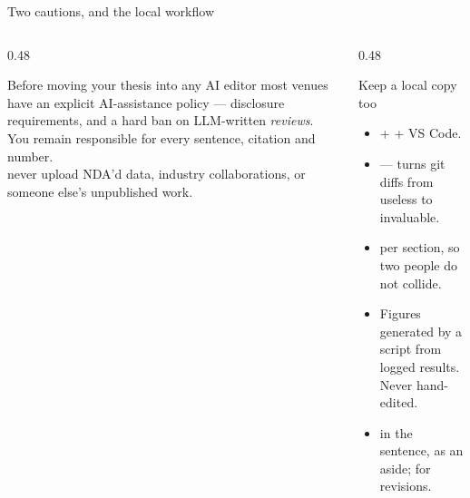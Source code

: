 \documentclass[aspectratio=169,11pt]{beamer}
\begin{document}
\begin{frame}{Two cautions, and the local workflow}
\begin{columns}[T]
\begin{column}{0.48\textwidth}
\begin{alertblock}{Before moving your thesis into any AI editor}
\footnotesize
{} most venues have an explicit AI-assistance policy --- disclosure
requirements, and a hard ban on LLM-written \emph{reviews}. You remain
responsible for every sentence, citation and number.\\[4pt]
 never upload NDA'd data, industry collaborations, or
someone else's unpublished work.
\end{alertblock}
\end{column}
\begin{column}{0.48\textwidth}
\begin{block}{Keep a local copy too}
\footnotesize
\begin{itemize}
  \item {} +  + VS Code.
  \item {} --- turns git diffs from useless to
        invaluable.
  \item {} per section, so two people do not collide.
  \item Figures generated by a script from logged results. Never hand-edited.
  \item {} in the sentence, 
        as an aside;  for revisions.
\end{itemize}
\end{block}
\end{column}
\end{columns}
\end{frame}
\end{document}
